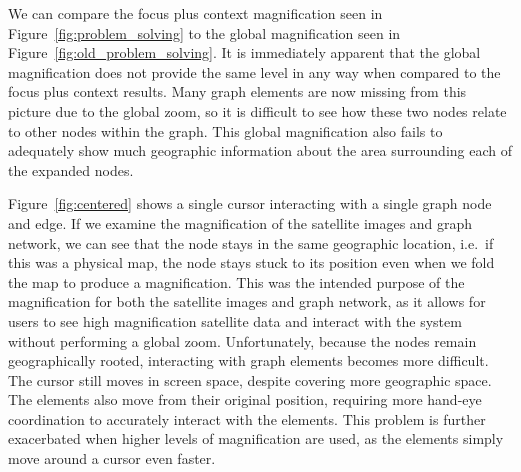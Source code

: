 We can compare the focus plus context magnification seen in Figure~\ref{fig:problem_solving} to the global magnification seen in Figure~\ref{fig:old_problem_solving}. It is immediately apparent that the global magnification does not provide the same level in any way when compared to the focus plus context results. Many graph elements are now missing from this picture due to the global zoom, so it is difficult to see how these two nodes relate to other nodes within the graph.
This global magnification also fails to adequately show much geographic information about the area surrounding each of the expanded nodes.


Figure~\ref{fig:centered} shows a single cursor interacting with a single graph node and edge. If we examine the magnification of the satellite images and graph network, we can see that the node stays in the same geographic location, i.e.\ if this was a physical map, the node stays stuck to its position even when we fold the map to produce a magnification. This was the intended purpose of the magnification for both the satellite images and graph network, as it allows for users to see high magnification satellite data and interact with the system without performing a global
zoom. Unfortunately, because the nodes remain geographically rooted, interacting with graph elements becomes more difficult. The cursor still moves in screen space, despite covering more geographic space. The elements also move from their original position, requiring more hand-eye coordination to accurately interact with the elements. This problem is further exacerbated when higher levels of magnification are used, as the elements simply move around a cursor even faster.

